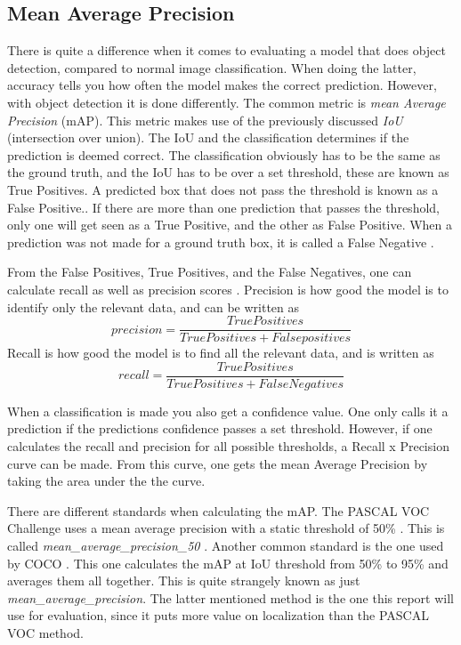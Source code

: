 \subsection{Mean Average Precision}

There is quite a difference when it comes to evaluating a model that does object detection,  compared to normal image classification. When doing the latter, accuracy tells you how often the model makes the correct prediction. However, with object detection it is done differently. The common metric is \textit{mean Average Precision} (mAP).  This metric makes use of the previously discussed \textit{IoU} (intersection over union). The IoU and the classification determines if the prediction is deemed correct. The classification obviously has to be the same as the ground truth, and the IoU has to be over a set threshold, these are known as True Positives. A predicted box that does not pass the threshold is known as a False Positive.. If there are more than one prediction that passes the threshold, only one will get seen as a True Positive, and the other as False Positive. When a prediction was not made for a ground truth box, it is called a False Negative \cite{turiAdvanced}.

From the False Positives, True Positives, and the False Negatives, one can calculate recall as well as precision scores \cite{rafaelpadilla}.  Precision is how good the model is to identify only the relevant data, and can be written as
\[ precision = \frac{True Positives}{True Positives + False positives }\]
Recall is how good the model is to find all the relevant data, and is written as 
\[ recall = \frac{True Positives}{True Positives +False Negatives }\]


 When a classification is made you also get a confidence value. One only calls it a prediction if the predictions confidence passes a set threshold. However, if one calculates the recall and precision for all possible thresholds, a Recall x Precision curve can be made. From this curve, one gets the mean Average Precision by taking the area under the the curve.

There are different standards when calculating the mAP. The PASCAL VOC Challenge uses a mean average precision with a static threshold of 50\%
 \cite{PASCAL}. This is called   \textit{mean\_average\_precision\_50} . Another common standard is the one used by COCO  \cite{COCO}. This one calculates the mAP at IoU threshold from 50\%  to 95\%  and averages them all together. This is quite strangely known as just \textit{mean\_average\_precision}. The latter mentioned method is the one this report will use for evaluation, since it puts more value on localization than the PASCAL VOC method.


\newpage
